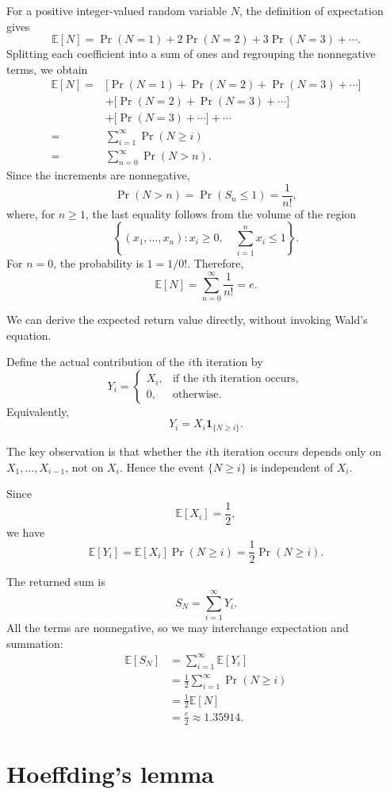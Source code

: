 \documentclass[11pt,a4paper]{article}
\begin{document}
For a positive integer-valued random variable $N$, the definition of
expectation gives
\[
\mathbb{E}[N]
=\Pr(N=1)+2\Pr(N=2)+3\Pr(N=3)+\cdots.
\]
Splitting each coefficient into a sum of ones and regrouping the
nonnegative terms, we obtain
\[
\begin{aligned}
\mathbb{E}[N]
={}&\bigl[\Pr(N=1)+\Pr(N=2)+\Pr(N=3)+\cdots\bigr]\\
&+\bigl[\Pr(N=2)+\Pr(N=3)+\cdots\bigr]\\
&+\bigl[\Pr(N=3)+\cdots\bigr]+\cdots\\
={}&\sum_{i=1}^{\infty}\Pr(N\geq i)\\
={}&\sum_{n=0}^{\infty}\Pr(N>n).
\end{aligned}
\]
Since the increments are nonnegative,
\[
\Pr(N>n)=\Pr(S_n\leq 1)=\frac{1}{n!},
\]
where, for $n\geq 1$, the last equality follows from the volume of the
region
\[
\left\{(x_1,\ldots,x_n):x_i\geq 0,\quad
\sum_{i=1}^{n}x_i\leq 1\right\}.
\]
For $n=0$, the probability is $1=1/0!$. Therefore,
\[
\mathbb{E}[N]
=\sum_{n=0}^{\infty}\frac{1}{n!}
=e.
\]

We can derive the expected return value directly, without invoking
Wald's equation.

Define the actual contribution of the $i$th iteration by
\[
Y_i=
\begin{cases}
X_i, & \text{if the $i$th iteration occurs},\\
0,   & \text{otherwise}.
\end{cases}
\]
Equivalently,
\[
Y_i=X_i\mathbf{1}_{\{N\geq i\}}.
\]

The key observation is that whether the $i$th iteration occurs depends
only on $X_1,\ldots,X_{i-1}$, not on $X_i$. Hence the event
$\{N\geq i\}$ is independent of $X_i$.

Since
\[
\mathbb{E}[X_i]=\frac12,
\]
we have
\[
\mathbb{E}[Y_i]
=\mathbb{E}[X_i]\Pr(N\geq i)
=\frac12\Pr(N\geq i).
\]

The returned sum is
\[
S_N=\sum_{i=1}^{\infty}Y_i.
\]
All the terms are nonnegative, so we may interchange expectation and
summation:
\[
\begin{aligned}
\mathbb{E}[S_N]
&=\sum_{i=1}^{\infty}\mathbb{E}[Y_i]\\
&=\frac12\sum_{i=1}^{\infty}\Pr(N\geq i)\\
&=\frac12\mathbb{E}[N]\\
&=\frac e2\approx 1.35914.
\end{aligned}
\]
\section{Hoeffding's lemma}
\end{document}
